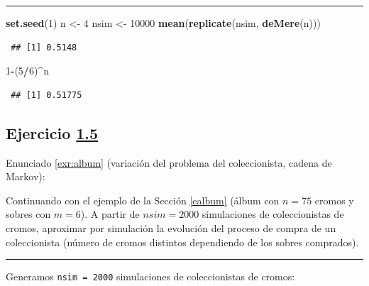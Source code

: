 \documentclass[
  spanish,
  10pt,
]{book}
\newenvironment{Shaded}{\begin{snugshade}}{\end{snugshade}}
\newcommand{\DecValTok}[1]{\textcolor[rgb]{0.00,0.00,0.81}{#1}}
\newcommand{\FunctionTok}[1]{\textcolor[rgb]{0.13,0.29,0.53}{\textbf{#1}}}
\newcommand{\NormalTok}[1]{#1}
\newcommand{\OtherTok}[1]{\textcolor[rgb]{0.56,0.35,0.01}{#1}}
\newcommand{\SpecialCharTok}[1]{\textcolor[rgb]{0.81,0.36,0.00}{\textbf{#1}}}
\theoremstyle{break}
\theoremstyle{nonumberplain}
\begin{document}
\begin{center}\rule{0.5\linewidth}{0.5pt}\end{center}

\begin{Shaded}
\begin{Highlighting}[]
\FunctionTok{set.seed}\NormalTok{(}\DecValTok{1}\NormalTok{)}
\NormalTok{n }\OtherTok{\textless{}{-}} \DecValTok{4}
\NormalTok{nsim }\OtherTok{\textless{}{-}} \DecValTok{10000}
\FunctionTok{mean}\NormalTok{(}\FunctionTok{replicate}\NormalTok{(nsim, }\FunctionTok{deMere}\NormalTok{(n)))}
\end{Highlighting}
\end{Shaded}

\begin{verbatim}
 ## [1] 0.5148
\end{verbatim}

\begin{Shaded}
\begin{Highlighting}[]
\DecValTok{1}\SpecialCharTok{{-}}\NormalTok{(}\DecValTok{5}\SpecialCharTok{/}\DecValTok{6}\NormalTok{)}\SpecialCharTok{\^{}}\NormalTok{n}
\end{Highlighting}
\end{Shaded}

\begin{verbatim}
 ## [1] 0.51775
\end{verbatim}

\subsection{\texorpdfstring{Ejercicio \href{ejercicios.html\#exr:album}{1.5}}{Ejercicio 1.5}}\label{sol-album}

Enunciado \ref{exr:album} (variación del problema del coleccionista, cadena de Markov):

Continuando con el ejemplo de la Sección \ref{ealbum}
(álbum con \(n = 75\) cromos y sobres con \(m = 6\)). A partir de \(nsim=2000\) simulaciones de coleccionistas de cromos, aproximar por simulación la evolución del proceso de compra de un coleccionista (número de cromos distintos dependiendo de los sobres comprados).

\begin{center}\rule{0.5\linewidth}{0.5pt}\end{center}

Generamos \texttt{nsim\ =\ 2000} simulaciones de coleccionistas de cromos:
\end{document}
